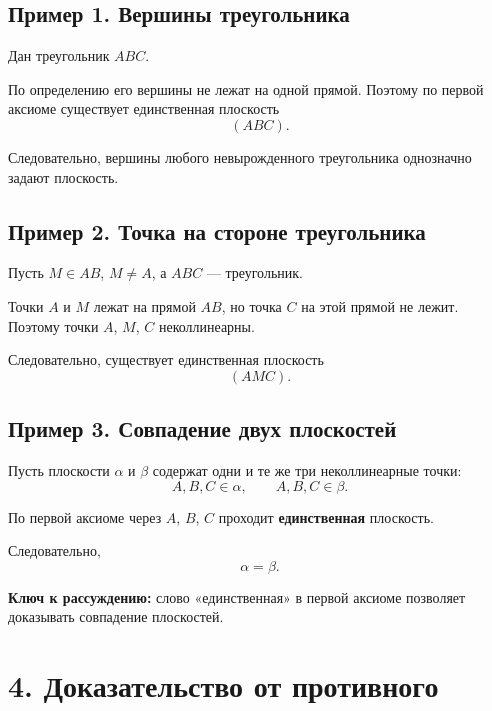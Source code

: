 \documentclass[a4paper,12pt]{article}
\newcommand{\important}[1]{\textbf{\textcolor{darkaccent}{#1}}}
\newcommand{\plane}[1]{(#1)}
\begin{document}
\subsection*{\textcolor{accent}{Пример 1. Вершины треугольника}}

Дан треугольник $ABC$.

По определению его вершины не лежат на одной прямой. Поэтому по первой аксиоме существует единственная плоскость
\[
\plane{ABC}.
\]

Следовательно, вершины любого невырожденного треугольника однозначно задают плоскость.


\subsection*{\textcolor{accent}{Пример 2. Точка на стороне треугольника}}

Пусть $M\in AB$, $M\ne A$, а $ABC$ --- треугольник.

Точки $A$ и $M$ лежат на прямой $AB$, но точка $C$ на этой прямой не лежит. Поэтому точки $A$, $M$, $C$ неколлинеарны.

Следовательно, существует единственная плоскость
\[
\plane{AMC}.
\]


\subsection*{\textcolor{accent}{Пример 3. Совпадение двух плоскостей}}

Пусть плоскости $\alpha$ и $\beta$ содержат одни и те же три неколлинеарные точки:
\[
A,B,C\in\alpha,
\qquad
A,B,C\in\beta.
\]

По первой аксиоме через $A$, $B$, $C$ проходит \textbf{единственная} плоскость.

Следовательно,
\[
\boxed{\alpha=\beta}.
\]

\important{Ключ к рассуждению:} слово «единственная» в первой аксиоме позволяет доказывать совпадение плоскостей.


\section*{\textcolor{darkaccent}{4. Доказательство от противного}}
\end{document}

